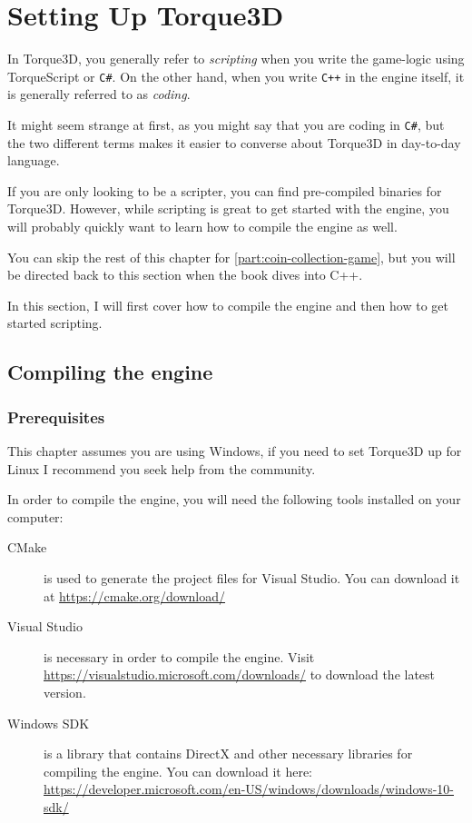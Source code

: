 

\chapter{Setting Up Torque3D}
\label{cha:t3d-setup}

In Torque3D, you generally refer to \textit{scripting} when you write the game-logic using TorqueScript or \texttt{C\#}. On the other hand, when you write \texttt{C++} in the engine itself, it is generally referred to as \textit{coding}.

It might seem strange at first, as you might say that you are coding in \texttt{C\#}, but the two different terms makes it easier to converse about Torque3D in day-to-day language.

If you are only looking to be a scripter, you can find pre-compiled binaries for Torque3D. However, while scripting is great to get started with the engine, you will probably quickly want to learn how to compile the engine as well.

\begin{remark}
	You can skip the rest of this chapter for \autoref{part:coin-collection-game}, but you will be directed back to this section when the book dives into C++.
\end{remark}

In this section, I will first cover how to compile the engine and then how to get started scripting. 


\section{Compiling the engine}
\subsection{Prerequisites}
\begin{remark}
	This chapter assumes you are using Windows, if you need to set Torque3D up for Linux I recommend you seek help from the community.
\end{remark}

In order to compile the engine, you will need the following tools installed on your computer:
\begin{description}
	\item[CMake] is used to generate the project files for Visual Studio. You can download it at \url{https://cmake.org/download/}
	\item[Visual Studio] is necessary in order to compile the engine.
	Visit \url{https://visualstudio.microsoft.com/downloads/} to download the latest version.
	\item[Windows SDK] is a library that contains DirectX and other necessary libraries for compiling the engine. You can download it here: \url{https://developer.microsoft.com/en-US/windows/downloads/windows-10-sdk/}
\end{description}

